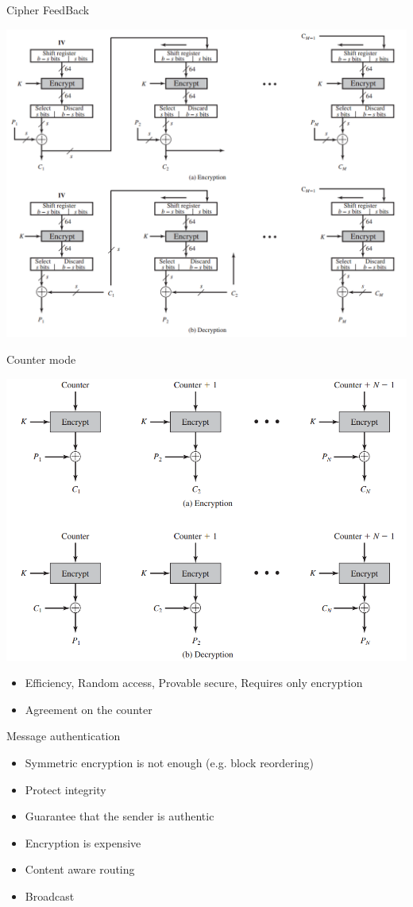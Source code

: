 \documentclass{beamer}
\begin{document}
\begin{frame}[t]{Cipher FeedBack}
  \begin{center}
    \includegraphics[width=0.7\linewidth]{CFB}
  \end{center}
\end{frame}

\begin{frame}[t]{Counter mode}
  \begin{center}
    \includegraphics[width=0.7\linewidth]{CTR}
  \end{center}
  \begin{itemize}
  \item<2-> Efficiency, Random access, Provable secure, Requires only
    encryption
  \item<3-> Agreement on the counter
  \end{itemize}
\end{frame}

\begin{frame}{Message authentication}
  \begin{itemize}
\item Symmetric encryption is not enough (e.g. block reordering)
\item Protect integrity
\item Guarantee that the sender is authentic
\item Encryption is expensive
\item Content aware routing
\item Broadcast
  \end{itemize}
\end{frame}
\end{document}
